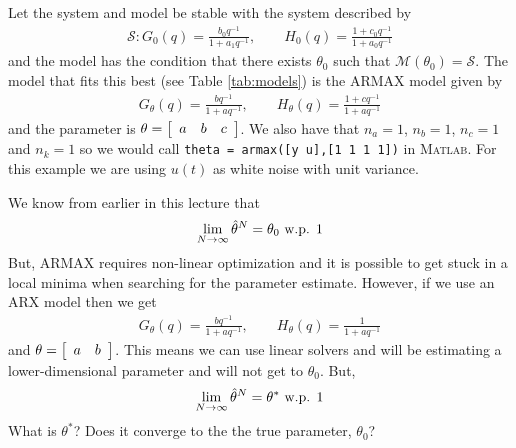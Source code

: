 \begin{example}
\label{ex:convergence}
Let the system and model be stable with the system described by
\begin{align*}
\mathcal{S}: G_0(q) = \frac{b_0q^{-1}}{1+a_1q^{-1}}, \qquad H_0(q)=\frac{1+c_0q^{-1}}{1+a_0q^{-1}}
\end{align*}
and the model has the condition that there exists $\theta_0$ such that $\mathcal{M}(\theta_0) = \mathcal{S}$. The model that fits this best (see Table \ref{tab:models}) is the ARMAX model given by
\begin{align*}
G_\theta(q) = \frac{bq^{-1}}{1+aq^{-1}}, \qquad H_\theta(q)=\frac{1+cq^{-1}}{1+aq^{-1}}
\end{align*}
and the parameter is $\theta=\left[\begin{array}{c c c} a & b & c \end{array}\right]$. We also have that $n_a=1$, $n_b=1$, $n_c=1$ and $n_k=1$ so we would call \texttt{theta = armax([y u],[1 1 1 1])} in \textsc{Matlab}. For this example we are using $u(t)$ as white noise with unit variance.

We know from earlier in this lecture that
$$\lim_{N\to\infty}\hat{\theta}^N = \theta_0 \text{ w.p. } 1$$
But, ARMAX requires non-linear optimization and it is possible to get stuck in a local minima when searching for the parameter estimate. However, if we use an ARX model then we get
\begin{align*}
G_\theta(q) = \frac{bq^{-1}}{1+aq^{-1}}, \qquad H_\theta(q)=\frac{1}{1+aq^{-1}}
\end{align*}
and $\theta=\left[\begin{array}{c c} a & b \end{array}\right]$. This means we can use linear solvers and will be estimating a lower-dimensional parameter and will not get to $\theta_0$. But,
$$\lim_{N\to\infty}\hat{\theta}^N = \theta^\ast \text{ w.p. } 1$$
What is $\theta^\ast$? Does it converge to the the true parameter, $\theta_0$?


\end{example}
